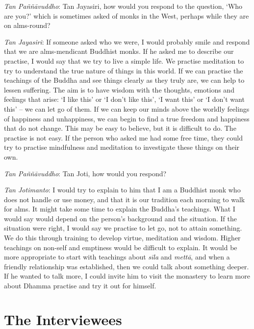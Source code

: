 \emph{Tan Paññāvuddho}: Tan Jayasiri, how would you respond to the
question, `Who are you?' which is sometimes asked of monks in the West, 
perhaps while they are on alms-round? 

\emph{Tan Jayasiri}: If someone asked who we were, I would probably
smile and respond that we are alms-mendicant Buddhist monks. If he asked
me to describe our practise, I would say that we try to live a simple
life. We practise meditation to try to understand the true nature of
things in this world. If we can practise the teachings of the Buddha and
see things clearly as they truly are, we can help to lessen suffering. 
The aim is to have wisdom with the thoughts, emotions and feelings that
arise: `I like this' or `I don't like this', `I want this' or `I don't
want this' -- we can let go of them. If we can keep our minds above the
worldly feelings of happiness and unhappiness, we can begin to find a
true freedom and happiness that do not change. This may be easy to
believe, but it is difficult to do. The practise is not easy. If the
person who asked me had some free time, they could try to practise
mindfulness and meditation to investigate these things on their own. 

\emph{Tan Paññāvuddho}: Tan Joti, how would you respond? 

\emph{Tan Jotimanto}: I would try to explain to him that I am a Buddhist
monk who does not handle or use money, and that it is our tradition each
morning to walk for alms. It might take some time to explain the
Buddha's teachings. What I would say would depend on the person's
background and the situation. If the situation were right, I would say
we practise to let go, not to attain something. We do this through
training to develop virtue, meditation and wisdom. Higher teachings on
non-self and emptiness would be difficult to explain. It would be more
appropriate to start with teachings about \emph{sīla} and \emph{mettā}, 
and when a friendly relationship was established, then we could talk
about something deeper. If he wanted to talk more, I could invite him to
visit the monastery to learn more about Dhamma practise and try it out
for himself. 

\dividerRule

\section{The Interviewees}

